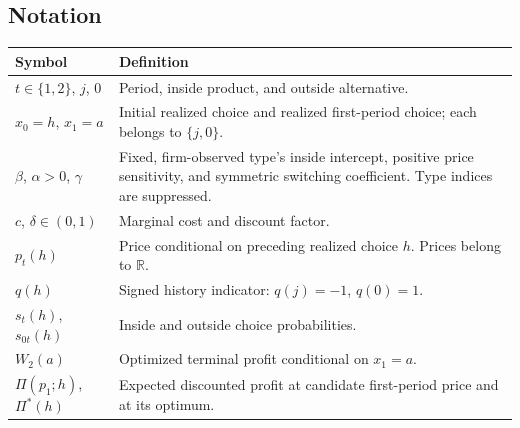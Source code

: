 \documentclass[11pt]{article}
\newcommand{\R}{\mathbb{R}}
\begin{document}
\subsection{Notation}
\small
\begin{longtable}{p{.28\linewidth}p{.66\linewidth}}
\toprule Symbol & Definition\\\midrule\endhead
$t\in\{1,2\}$, $j$, $0$ & Period, inside product, and outside alternative.\\
$x_0=h$, $x_1=a$ & Initial realized choice and realized first-period choice; each belongs to $\{j,0\}$.\\
$\beta$, $\alpha>0$, $\gamma$ & Fixed, firm-observed type's inside intercept, positive price sensitivity, and symmetric switching coefficient. Type indices are suppressed.\\
$c$, $\delta\in(0,1)$ & Marginal cost and discount factor.\\
$p_t(h)$ & Price conditional on preceding realized choice $h$. Prices belong to $\R$.\\
$q(h)$ & Signed history indicator: $q(j)=-1$, $q(0)=1$.\\
$s_t(h)$, $s_{0t}(h)$ & Inside and outside choice probabilities.\\
$W_2(a)$ & Optimized terminal profit conditional on $x_1=a$.\\
$\Pi(p_1;h)$, $\Pi^*(h)$ & Expected discounted profit at candidate first-period price and at its optimum.\\
\bottomrule
\end{longtable}
\normalsize
\end{document}
